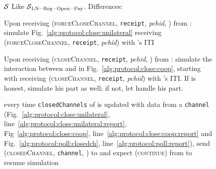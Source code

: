 \begin{figure}[!htbp]
  \begin{simulatorbox}{$\mathcal{S}$}
    Like $\mathcal{S}{}_{\mathrm{LN - Reg - Open - Pay}}$. Differences:
    \begin{algorithmic}[1]
      \State Upon receiving (\textsc{forceCloseChannel}, \texttt{receipt},
      \textit{pchid}, \alice) from \fpaynet:
      \Indent
        \State simulate Fig.~\ref{alg:protocol:close:unilateral} receiving
        (\textsc{forceCloseChannel}, \texttt{receipt}, \textit{pchid}) with
        \alice's ITI
      \EndIndent
      \Statex

      \State Upon receiving (\textsc{closeChannel}, \texttt{receipt},
      \textit{pchid}, \alice) from \fpaynet:
      \Indent
        \State simulate the interaction between \alice{} and \bob{} in
        Fig.~\ref{alg:protocol:close:coop}, starting with \alice{} receiving
        (\textsc{closeChannel}, \texttt{receipt}, \textit{pchid}) with \alice's
        ITI. If \bob{} is honest, simulate his part as well; if not, let
        \adversary{} handle his part.
        \label{alg:sim:close:coop}
      \EndIndent
      \Statex

      \State every time \texttt{closedChannels} of \alice{} is updated with data
      from a \texttt{channel} (Fig.~\ref{alg:protocol:close:unilateral},
      line~\ref{alg:protocol:close:unilateral:report},
      Fig~\ref{alg:protocol:close:coop},
      line~\ref{alg:protocol:close:coop:report} and
      Fig.~\ref{alg:protocol:poll:closedch},
      line~\ref{alg:protocol:poll:report}), send (\textsc{closedChannel},
      \texttt{channel}, \alice) to \fpaynet{} and expect (\textsc{continue})
      from \fpaynet{} to resume simulation
      \label{alg:sim:close:report}
    \end{algorithmic}
  \end{simulatorbox}
  \caption{}
  \label{alg:sim:close}
\end{figure}

